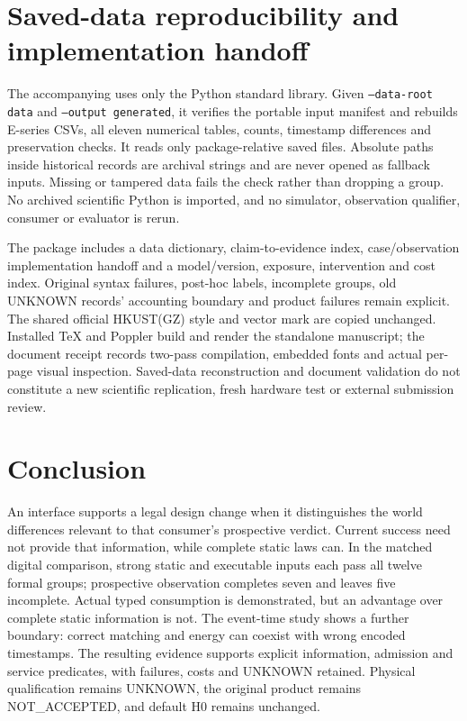 \section{Saved-data reproducibility and implementation handoff}
The accompanying  uses only the Python standard
library. Given \texttt{--data-root data} and \texttt{--output generated}, it verifies
the portable input manifest and rebuilds E-series CSVs, all eleven
numerical tables, counts, timestamp differences and preservation
checks. It reads only package-relative saved files. Absolute paths
inside historical records are archival strings and are never opened
as fallback inputs. Missing or tampered data fails the check rather
than dropping a group. No archived scientific Python is imported,
and no simulator, observation qualifier, consumer or evaluator is
rerun.

The package includes a data dictionary, claim-to-evidence index,
case/observation implementation handoff and a model/version,
exposure, intervention and cost index. Original syntax failures,
post-hoc labels, incomplete groups, old UNKNOWN records' accounting
boundary and product failures remain explicit. The shared official
HKUST(GZ) style and vector mark are copied unchanged. Installed
TeX and Poppler build and render the standalone manuscript; the
document receipt records two-pass compilation, embedded fonts and
actual per-page visual inspection. Saved-data reconstruction and
document validation do not constitute a new scientific replication,
fresh hardware test or external submission review.

\section{Conclusion}
An interface supports a legal design change when it distinguishes
the world differences relevant to that consumer's prospective
verdict. Current success need not provide that information, while
complete static laws can. In the matched digital comparison,
strong static and executable inputs each pass all twelve formal
groups; prospective observation completes seven and leaves five
incomplete. Actual typed consumption is demonstrated, but an
advantage over complete static information is not. The event-time
study shows a further boundary: correct matching and energy can
coexist with wrong encoded timestamps. The resulting evidence
supports explicit information, admission and service predicates,
with failures, costs and UNKNOWN retained. Physical qualification
remains UNKNOWN, the original product remains NOT\_ACCEPTED,
and default H0 remains unchanged.
